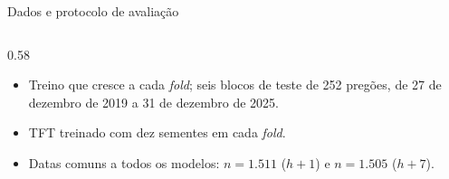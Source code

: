 \documentclass[aspectratio=169,10pt]{beamer}
\newcommand{\hum}{\(h{+}1\)}
\newcommand{\hsete}{\(h{+}7\)}
\begin{document}
\begin{frame}{Dados e protocolo de avaliação}
\begin{columns}[T]
\begin{column}{0.58\textwidth}
      \vspace{4pt}
      \raggedright\small
      \begin{itemize}
        \item Treino que cresce a cada \textit{fold}; seis blocos de teste de 252 pregões,
          de 27 de dezembro de 2019 a 31 de dezembro de 2025.
        \item TFT treinado com dez sementes em cada \textit{fold}.
        \item Datas comuns a todos os modelos: \(n = 1.511\) (\hum) e \(n = 1.505\) (\hsete).
      \end{itemize}
    \end{column}
  \end{columns}
\end{frame}

\end{document}
